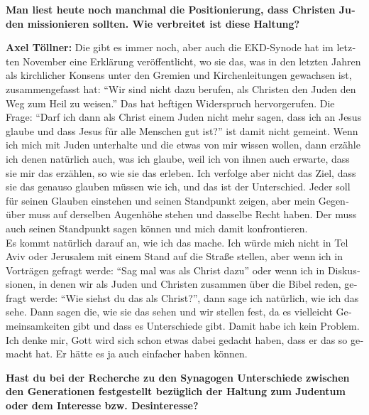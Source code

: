 \begin{otherlanguage}{ngerman}
\textbf{Man liest heute noch manchmal die Positionierung, dass Christen Juden missionieren sollten. Wie verbreitet ist diese Haltung?} 

\textbf{Axel Töllner:} Die gibt es immer noch, aber auch die EKD-Synode hat im letzten November eine Erklärung veröffentlicht, wo sie das, was in den letzten Jahren als kirchlicher Konsens unter den Gremien und Kirchenleitungen gewachsen ist, zusammengefasst hat: "`Wir sind nicht dazu berufen, als Christen den Juden den Weg zum Heil zu weisen."' Das hat heftigen Widerspruch hervorgerufen. Die Frage: "`Darf ich dann als Christ einem Juden nicht mehr sagen, dass ich an Jesus glaube und dass Jesus für alle Menschen gut ist?"' ist damit nicht gemeint. Wenn ich mich mit Juden unterhalte und die etwas von mir wissen wollen, dann erzähle ich denen natürlich auch, was ich glaube, weil ich von ihnen auch erwarte, dass sie mir das erzählen, so wie sie das erleben. Ich verfolge aber nicht das Ziel, dass sie das genauso glauben müssen wie ich, und das ist der Unterschied. Jeder soll für seinen Glauben einstehen und seinen Standpunkt zeigen, aber mein Gegenüber muss auf derselben Augenhöhe stehen und dasselbe Recht haben. Der muss auch seinen Standpunkt sagen können und mich damit konfrontieren. \\ 
Es kommt natürlich darauf an, wie ich das mache. Ich würde mich nicht in Tel Aviv oder Jerusalem mit einem Stand auf die Straße stellen, aber wenn ich in Vorträgen gefragt werde: "`Sag mal was als Christ dazu"' oder wenn ich in Diskussionen, in denen wir als Juden und Christen zusammen über die Bibel reden, gefragt werde: "`Wie siehst du das als Christ?"', dann sage ich natürlich, wie ich das sehe. Dann sagen die, wie sie das sehen und wir stellen fest, da es vielleicht Gemeinsamkeiten gibt und dass es Unterschiede gibt. Damit habe ich kein Problem. Ich denke mir, Gott wird sich schon etwas dabei gedacht haben, dass er das so gemacht hat. Er hätte es ja auch einfacher haben können.  

\textbf{Hast du bei der Recherche zu den Synagogen Unterschiede zwischen den Generationen festgestellt bezüglich der Haltung zum Judentum oder dem Interesse bzw. Desinteresse?} 
 

\end{otherlanguage}
